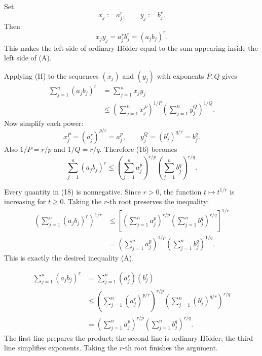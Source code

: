 \documentclass[11pt]{article}
\begin{document}
\begin{solutionBox}
Set
\[
  x_j:=a_j^r,
  \qquad
  y_j:=b_j^r.
  \tag{14}
\]
Then
\[
  x_jy_j=a_j^rb_j^r=(a_jb_j)^r.
  \tag{15}
\]
This makes the left side of ordinary H\"older equal to the sum appearing inside the left side of (A).
\end{solutionBox}

\begin{solutionBox}
Applying (H) to the sequences \((x_j)\) and \((y_j)\) with exponents \(P,Q\) gives
\[
\begin{aligned}
 \sum_{j=1}^{n}(a_jb_j)^r
 &=\sum_{j=1}^{n}x_jy_j\\
 &\leq
 \left(\sum_{j=1}^{n}x_j^P\right)^{1/P}
 \left(\sum_{j=1}^{n}y_j^Q\right)^{1/Q}.
\end{aligned}
\tag{16}
\]
Now simplify each power:
\[
 x_j^P=(a_j^r)^{p/r}=a_j^p,
 \qquad
 y_j^Q=(b_j^r)^{q/r}=b_j^q.
 \tag{17}
\]
Also \(1/P=r/p\) and \(1/Q=r/q\). Therefore (16) becomes
\[
 \sum_{j=1}^{n}(a_jb_j)^r
 \leq
 \left(\sum_{j=1}^{n}a_j^p\right)^{r/p}
 \left(\sum_{j=1}^{n}b_j^q\right)^{r/q}.
 \tag{18}
\]
\end{solutionBox}

\begin{solutionBox}
Every quantity in (18) is nonnegative. Since \(r>0\), the function \(t\mapsto t^{1/r}\) is increasing for \(t\geq0\). Taking the \(r\)-th root preserves the inequality:
\[
\begin{aligned}
 \left(\sum_{j=1}^{n}(a_jb_j)^r\right)^{1/r}
 &\leq
 \left[
 \left(\sum_{j=1}^{n}a_j^p\right)^{r/p}
 \left(\sum_{j=1}^{n}b_j^q\right)^{r/q}
 \right]^{1/r}\\[2pt]
 &=
 \left(\sum_{j=1}^{n}a_j^p\right)^{1/p}
 \left(\sum_{j=1}^{n}b_j^q\right)^{1/q}.
\end{aligned}
\tag{19}
\]
This is exactly the desired inequality (A).
\end{solutionBox}

\begin{ideaBox}
\[
\begin{aligned}
 \sum_{j=1}^{n}(a_jb_j)^r
 &=\sum_{j=1}^{n}(a_j^r)(b_j^r)\\
 &\leq
 \left(\sum_{j=1}^{n}(a_j^r)^{p/r}\right)^{r/p}
 \left(\sum_{j=1}^{n}(b_j^r)^{q/r}\right)^{r/q}\\
 &=
 \left(\sum_{j=1}^{n}a_j^p\right)^{r/p}
 \left(\sum_{j=1}^{n}b_j^q\right)^{r/q}.
\end{aligned}
\]
The first line prepares the product; the second line is ordinary H\"older; the third line simplifies exponents. Taking the \(r\)-th root finishes the argument.
\end{ideaBox}
\end{document}

